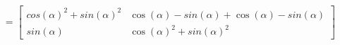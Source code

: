 \documentclass[preview]{standalone}
\begin{document}
\begin{align*}
=\begin{bmatrix} cos(\alpha)^2 + sin(\alpha)^2  & \cos(\alpha)  -sin(\alpha) + \cos(\alpha)  -sin(\alpha) \\ sin(\alpha) & \cos(\alpha)^2+  sin(\alpha)^2\end{bmatrix}
\end{align*}
\end{document}

